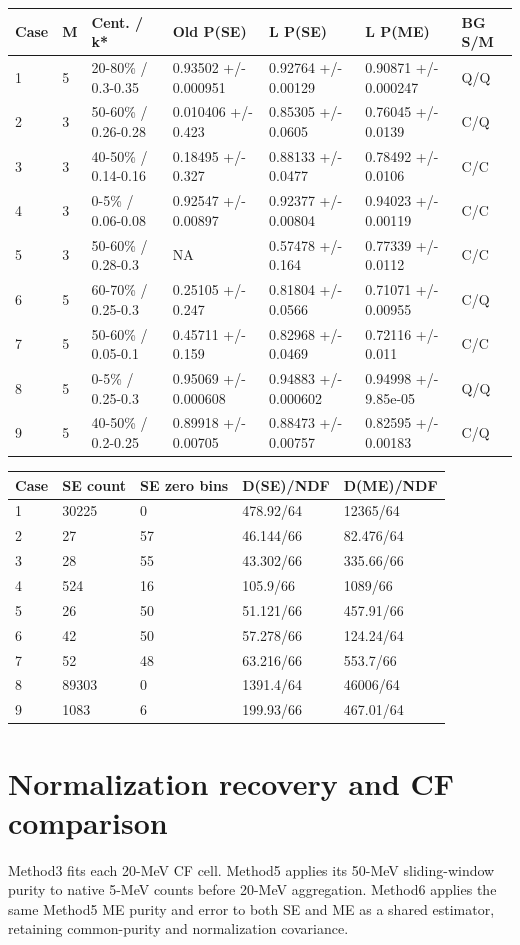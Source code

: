 \documentclass[10pt,a4paper]{article}
\begin{document}
{\small\setlength{\tabcolsep}{3pt}\begin{longtable}{lllllll}\toprule
Case & M & Cent. / k* & Old P(SE) & L P(SE) & L P(ME) & BG S/M\\\midrule\endhead
1 & 5 & 20-80\% / 0.3-0.35 & 0.93502 +/- 0.000951 & 0.92764 +/- 0.00129 & 0.90871 +/- 0.000247 & Q/Q\\
2 & 3 & 50-60\% / 0.26-0.28 & 0.010406 +/- 0.423 & 0.85305 +/- 0.0605 & 0.76045 +/- 0.0139 & C/Q\\
3 & 3 & 40-50\% / 0.14-0.16 & 0.18495 +/- 0.327 & 0.88133 +/- 0.0477 & 0.78492 +/- 0.0106 & C/C\\
4 & 3 & 0-5\% / 0.06-0.08 & 0.92547 +/- 0.00897 & 0.92377 +/- 0.00804 & 0.94023 +/- 0.00119 & C/C\\
5 & 3 & 50-60\% / 0.28-0.3 & NA & 0.57478 +/- 0.164 & 0.77339 +/- 0.0112 & C/C\\
6 & 5 & 60-70\% / 0.25-0.3 & 0.25105 +/- 0.247 & 0.81804 +/- 0.0566 & 0.71071 +/- 0.00955 & C/Q\\
7 & 5 & 50-60\% / 0.05-0.1 & 0.45711 +/- 0.159 & 0.82968 +/- 0.0469 & 0.72116 +/- 0.011 & C/C\\
8 & 5 & 0-5\% / 0.25-0.3 & 0.95069 +/- 0.000608 & 0.94883 +/- 0.000602 & 0.94998 +/- 9.85e-05 & Q/Q\\
9 & 5 & 40-50\% / 0.2-0.25 & 0.89918 +/- 0.00705 & 0.88473 +/- 0.00757 & 0.82595 +/- 0.00183 & C/Q\\
\bottomrule\end{longtable}}
{\small\setlength{\tabcolsep}{3pt}\begin{longtable}{lllll}\toprule
Case & SE count & SE zero bins & D(SE)/NDF & D(ME)/NDF\\\midrule\endhead
1 & 30225 & 0 & 478.92/64 & 12365/64\\
2 & 27 & 57 & 46.144/66 & 82.476/64\\
3 & 28 & 55 & 43.302/66 & 335.66/66\\
4 & 524 & 16 & 105.9/66 & 1089/66\\
5 & 26 & 50 & 51.121/66 & 457.91/66\\
6 & 42 & 50 & 57.278/66 & 124.24/64\\
7 & 52 & 48 & 63.216/66 & 553.7/66\\
8 & 89303 & 0 & 1391.4/64 & 46006/64\\
9 & 1083 & 6 & 199.93/66 & 467.01/64\\
\bottomrule\end{longtable}}
\clearpage
\section*{Normalization recovery and CF comparison}
Method3 fits each 20-MeV CF cell. Method5 applies its 50-MeV sliding-window purity to native 5-MeV counts before 20-MeV aggregation. Method6 applies the same Method5 ME purity and error to both SE and ME as a shared estimator, retaining common-purity and normalization covariance.
\end{document}
